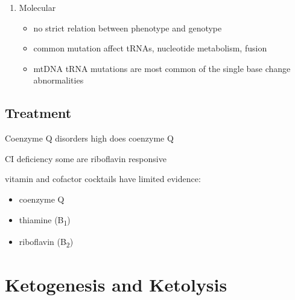 \documentclass{scrartcl}
\begin{document}
\begin{enumerate}
\item Molecular
\label{sec:org679304e}
\begin{itemize}
\item no strict relation between phenotype and genotype
\item common mutation affect tRNAs, nucleotide metabolism, fusion
\item mtDNA tRNA mutations are most common of the single base change abnormalities
\end{itemize}
\end{enumerate}

\subsection{Treatment}
\label{sec:org39c5f15}
\begin{description}
\item{Coenzyme Q disorders} high does coenzyme Q
\item{CI deficiency} some are riboflavin responsive
\item vitamin and cofactor cocktails have limited evidence:
\begin{itemize}
\item coenzyme Q
\item thiamine (B\textsubscript{1})
\item riboflavin (B\textsubscript{2})
\end{itemize}
\end{description}
\section{Ketogenesis and Ketolysis}
\label{sec:org99686cf}
\end{document}
